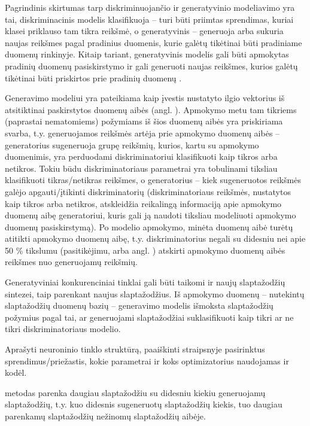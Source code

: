\documentclass{VUMIFInfBakalaurinis}
\begin{document}
Pagrindinis skirtumas tarp diskriminuojančio ir generatyvinio modeliavimo yra 
tai, diskriminacinis modelis klasifikuoja -- turi būti priimtas sprendimas, 
kuriai klasei priklauso tam tikra reikšmė, o generatyvinis -- generuoja arba 
sukuria naujas reikšmes pagal pradinius duomenis, kurie galėtų tikėtinai būti 
pradiniame duomenų rinkinyje. Kitaip tariant, generatyvinis modelis gali būti 
apmokytas pradinių duomenų pasiskirstymo ir gali generuoti naujas reikšmes, 
kurios galėtų tikėtinai būti priskirtos prie pradinių duomenų \cite{PRaML}.

Generavimo modeliui yra pateikiama kaip įvestis nustatyto ilgio vektorius iš 
atsitiktinai paskirstytos duomenų aibės (angl. ). Apmokymo metu tam tikriems (paprastai nematomiems) požymiams iš 
šios duomenų aibės yra priskiriama svarba, t.y. generuojamos reikšmės artėja 
prie apmokymo duomenų aibės -- generatorius sugeneruoja grupę reikšmių, kurios, 
kartu su apmokymo duomenimis, yra perduodami diskriminatoriui klasifikuoti kaip 
tikros arba netikros. Tokiu būdu diskriminatoriaus parametrai yra tobulinami 
tiksliau klasifikuoti tikras/netikras reikšmes, o generatorius -- kiek 
sugeneruotos reikšmės galėjo apgauti/įtikinti diskriminatorių (diskriminatoriaus 
reikšmės, nustatytos kaip tikros arba netikros, atskleidžia reikalingą 
informaciją apie apmokymo duomenų aibę generatoriui, kuris gali ją naudoti 
tiksliau modeliuoti apmokymo duomenų pasiskirstymą). Po modelio apmokymo, minėta 
duomenų aibė turėtų atitikti apmokymo duomenų aibę, t.y. diskriminatorius negali 
su didesniu nei apie 50 \% tikslumu (pasitikėjimu, arba angl. 
) atskirti apmokymo duomenų aibės reikšmes nuo generuojamų 
reikšmių.

Generatyviniai konkurenciniai tinklai gali būti taikomi ir naujų slaptažodžių 
sintezei, taip parenkant naujus slaptažodžius. Iš apmokymo duomenų -- nutekintų 
slaptažodžių duomenų bazių -- generavimo modelis išmoksta slaptažodžių požymius 
pagal tai, ar generuojami slaptažodžiai suklasifikuoti kaip tikri ar ne tikri 
diskriminatoriaus modelio.

Aprašyti neuroninio tinklo struktūrą, paaiškinti straipsnyje pasirinktus 
sprendimus/priežastis, kokie parametrai ir koks optimizatorius naudojamas ir 
kodėl.

 metodas parenka daugiau slaptažodžiu su didesniu kiekiu 
generuojamų slaptažodžių, t.y. kuo didesnis sugeneruotų slaptažodžių kiekis, tuo 
daugiau parenkamų slaptažodžių nežinomų slaptažodžių aibėje.
\end{document}
